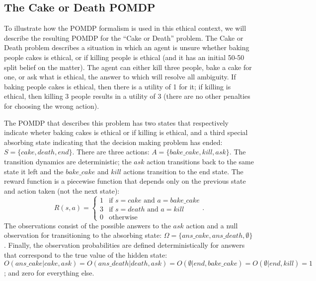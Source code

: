 \documentclass[11pt]{article}
\begin{document}
\subsection{The Cake or Death POMDP}
To illustrate how the POMDP formalism is used in this ethical context, we will describe the resulting POMDP for the ``Cake or Death'' problem. The Cake or Death problem describes a situation in which an agent is unsure whether baking people cakes is ethical, or if killing people is ethical (and it has an initial 50-50 split belief on the matter). The agent can either kill three people, bake a cake for one, or ask what is ethical, the answer to which will resolve all ambiguity. If baking people cakes is ethical, then there is a utility of 1 for it; if killing is ethical, then killing 3 people results in a utility of 3 (there are no other penalties for choosing the wrong action). 

The POMDP that describes this problem has two states that respectively indicate wheter baking cakes is ethical or if killing is ethical, and a third special absorbing state indicating that the decision making problem has ended: $S = \{ cake, death, end \}$. There are three actions: $A = \{bake\_cake, kill, ask \}$. The transition dynamics are deterministic; the $ask$ action transitions back to the same state it left and the $bake\_cake$ and $kill$ actions transition to the end state. The reward function is a piecewise function that depends only on the previous state and action taken (not the next state):
\[
R(s, a) = \begin{cases} 
1 & \mbox{if } s = cake \mbox{ and } a = bake\_cake \\
3 & \mbox{if } s = death \mbox{ and } a = kill \\
0 & \mbox{otherwise}
\end{cases}.
\]
The observations consist of the possible answers to the $ask$ action and a null observation for transitioning to the absorbing state: $\Omega = \{ans\_cake, ans\_death, \emptyset \}$. Finally, the observation probabilities are defined deterministically for answers that correspond to the true value of the hidden state: $O(ans\_cake | cake, ask) = O(ans\_death | death, ask) = O(\emptyset | end, bake\_cake) = O(\emptyset | end, kill) = 1$; and zero for everything else.
\end{document}
